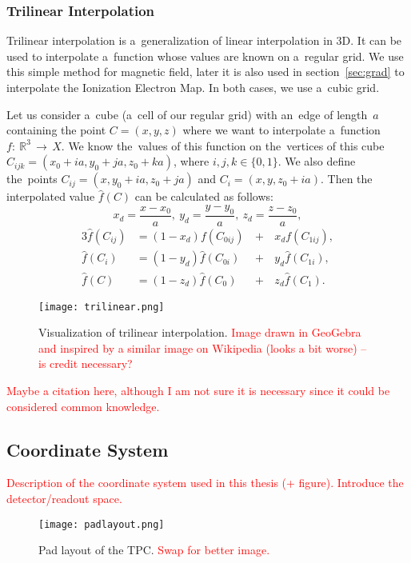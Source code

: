 			\subsubsection{Trilinear Interpolation}
				Trilinear interpolation is a~generalization of linear interpolation in 3D. It can be used to interpolate a~function whose values are known on a~regular grid. We use this simple method for magnetic field, later it is also used in section~\ref{sec:grad} to interpolate the Ionization Electron Map. In both cases, we use a~cubic grid.
				
				Let us consider a~cube (a~cell of our regular grid) with an~edge of length~$a$ containing the point $C = (x,y,z)$ where we want to interpolate a~function $f\!\!:~\!\!\mathbb{R}^3\,\to\,X$. We know the~values of this function on the~vertices of this cube $C_{ijk} = (x_0+ia,y_0+ja,z_0+ka)$, where $i,j,k \in \{0,1\}$. We also define the~points $C_{ij} = (x,y_0+ia,z_0+ja)$ and $C_i=(x,y,z_0+ia)$. Then the interpolated value $\widehat{f}(C)$ can be calculated as follows:
				\begin{equation}
					x_d = \frac{x-x_0}{a},~y_d = \frac{y-y_0}{a},~z_d = \frac{z-z_0}{a},
				\end{equation}
				\begin{alignat}{3}
					\widehat{f}(C_{ij}) &= (1-x_d)f(C_{0ij}) \,&+&\,x_d f(C_{1ij}),\\
					\widehat{f}(C_{i}) &= (1-y_d)\widehat{f}(C_{0i}) &+&\,y_d \widehat{f}(C_{1i}),\\
					\widehat{f}(C) &= (1-z_d)\widehat{f}(C_0) &+&\,z_d \widehat{f}(C_1).
				\end{alignat}
				
				\begin{figure}
					\centering
					\texttt{[image: trilinear.png]}
					\label{fig:trilin}
					\caption{Visualization of trilinear interpolation. \textcolor{red}{Image drawn in GeoGebra and inspired by a similar image on Wikipedia (looks a bit worse) -- is credit necessary?}}
				\end{figure}
				
				\textcolor{red}{Maybe a citation here, although I am not sure it is necessary since it could be considered common knowledge.}
		
		\subsection{Coordinate System}
		\label{sec:coor}
		\textcolor{red}{Description of the coordinate system used in this thesis (+ figure). Introduce the detector/readout space.}
	
	\begin{figure}
		\centering
		\texttt{[image: padlayout.png]}
		\caption{Pad layout of the TPC. \textcolor{red}{Swap for better image.}}
		\label{fig:padlayout}
	\end{figure}